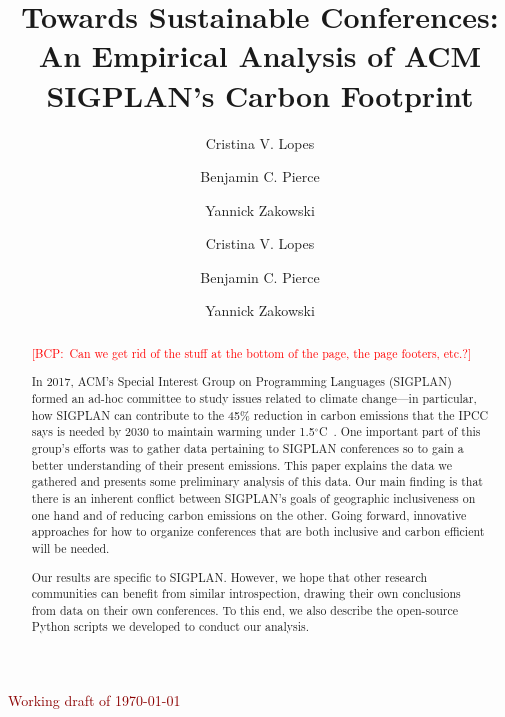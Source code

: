 \documentclass[screen,acmlarge]{acmart}
\title{Towards Sustainable Conferences: \\
An Empirical Analysis of ACM SIGPLAN's Carbon Footprint}
\author{Cristina V. Lopes}
\affiliation{%
  \institution{University of California, Irvine}
  \city{Irvine}
  \state{CA}
  \postcode{92697}
  \country{USA}}
\author{Benjamin C. Pierce}
\affiliation{%
  \institution{University of Pennsylvania}
  \city{Philadelphia}
  \state{PA}
  \country{USA}}
\author{Yannick Zakowski}
\affiliation{%
  \institution{University of Pennsylvania}
  \city{Philadelphia}
  \state{PA}
  \country{USA}}
\author{Cristina V. Lopes \and Benjamin C. Pierce \and Yannick Zakowski}
\newif\ifcomments\commentstrue   %
\newcommand{\bcp}[1]{\textcolor{red}{{[BCP:~#1]}}}
\newcommand{\bcp}[1]{}
\newif\ifopinions\opinionstrue   %
\begin{document}
\maketitle

\begin{abstract}
\ifacmstyle
\bcp{Can we get rid of the stuff at the bottom of the page, the page
  footers, etc.?}
\fi

\noindent In 2017, ACM's Special Interest Group on Programming Languages (SIGPLAN)
formed an ad-hoc committee to study issues related to climate change---in
particular, how SIGPLAN can contribute to the 45\% reduction in carbon
emissions that the IPCC says is needed by 2030 to maintain warming under
1.5$^{\circ}$C~\cite{IPCCReport}.
One important part of this group's efforts was
to gather data pertaining to SIGPLAN conferences so to gain a better
understanding of their present emissions. This paper explains the data we
gathered and presents some preliminary analysis of this data. Our main
finding is that there is an inherent conflict between SIGPLAN's goals of
geographic inclusiveness on one hand and of reducing carbon emissions on the
other. Going forward, innovative approaches for how to organize conferences
that are both inclusive and carbon efficient will be needed.

Our results are specific to SIGPLAN.  However, we hope that other research
communities can benefit from similar introspection, drawing their own
conclusions from data on their own conferences. To this end, we also
describe the open-source Python scripts we developed to conduct our
analysis.

\end{abstract}

\ifacmstyle
{}
\fi

\begin{center}
\bigskip
{\ifcomments\huge\textcolor{darkred}{Working draft of \today}\fi}
\end{center}









\end{document}

